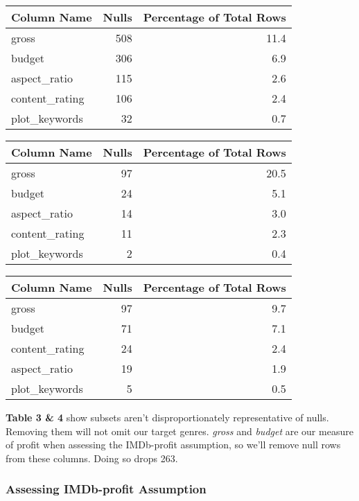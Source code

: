 \documentclass[11pt]{article}
\begin{document}
\begin{center}
\begin{tabular}{lrr}
\toprule
Column Name & Nulls & Percentage of Total Rows \\
\midrule
gross & 508 & 11.4 \\
budget & 306 & 6.9 \\
aspect\_ratio & 115 & 2.6 \\
content\_rating & 106 & 2.4 \\
plot\_keywords & 32 & 0.7 \\
\bottomrule
\end{tabular}
\vspace*{5mm}
\begin{tabular}{lrr}
\toprule
Column Name & Nulls & Percentage of Total Rows \\
\midrule
gross & 97 & 20.5 \\
budget & 24 & 5.1 \\
aspect\_ratio & 14 & 3.0 \\
content\_rating & 11 & 2.3 \\
plot\_keywords & 2 & 0.4 \\
\bottomrule
\end{tabular}
\vspace*{10mm}
\begin{tabular}{lrr}
\toprule
Column Name & Nulls & Percentage of Total Rows \\
\midrule
gross & 97 & 9.7 \\
budget & 71 & 7.1 \\
content\_rating & 24 & 2.4 \\
aspect\_ratio & 19 & 1.9 \\
plot\_keywords & 5 & 0.5 \\
\bottomrule
\end{tabular}
\end{center}

\textbf{Table 3 \& 4} show subsets aren’t disproportionately representative of nulls. Removing them will not omit our target genres. \textit{gross} and \textit{budget} are our measure of profit when assessing the IMDb-profit assumption, so we’ll remove null rows from these columns. Doing so drops 263.

\subsubsection{Assessing IMDb-profit Assumption}
\end{document}
